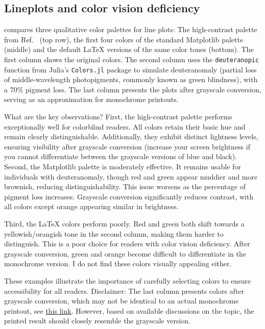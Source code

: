 \subsection{Lineplots and color vision deficiency}\label{sub:lineplots_and_color_deficiency}

 compares three qualitative color palettes for line plots: 
The high-contrast palette from Ref.~\cite{paultol} (top row), the first four colors of the standard Matplotlib palette (middle) and the default \LaTeX{} versions of the same color tones (bottom). The first column shows the original colors. The second column uses the \verb|deuteranopic| function from Julia’s \verb|Colors.jl| package to simulate deuteranomaly (partial loss of middle-wavelength photopigments, commonly known as green blindness), with a 70\% pigment loss. The last column presents the plots after grayscale conversion, serving as an approximation for monochrome printouts.

What are the key observations?
First, the high-contrast palette performs exceptionally well for colorblind readers.
All colors retain their basic hue and remain clearly distinguishable. Additionally, they exhibit distinct lightness levels, ensuring visibility after grayscale conversion (increase your screen brightness if you cannot differentiate between the grayscale versions of blue and black).
Second, the Matplotlib palette is moderately effective. It remains usable for individuals with deuteranomaly, though red and green appear muddier and more brownish, reducing distinguishability. This issue worsens as the percentage of pigment loss increases. Grayscale conversion significantly reduces contrast, with all colors except orange appearing similar in brightness.

Third, the \LaTeX{} colors perform poorly. Red and green both shift towards a yellowish/orangish tone in the second column, making them harder to distinguish. This is a poor choice for readers with color vision deficiency. After grayscale conversion, green and orange become difficult to differentiate in the monochrome version. I do not find these colors visually appealing either. 

These examples illustrate the importance of carefully selecting colors to ensure accessibility for all readers. Disclaimer: The last column presents colors after grayscale conversion, which may not be identical to an actual monochrome printout, see \href{https://1800officesolutions.com/monochrome-vs-grayscale-printing/}{this link}. However, based on available discussions on the topic, the printed result should closely resemble the grayscale version.

